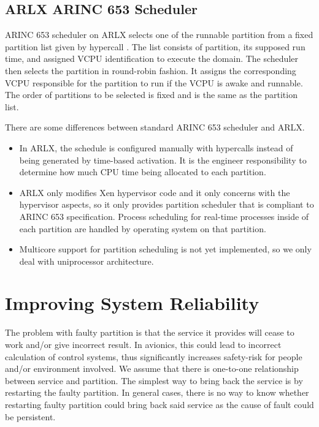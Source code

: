 \documentclass[conference]{IEEEtran}
\begin{document}
\subsection{ARLX ARINC 653 Scheduler}
ARINC 653 scheduler on ARLX selects one of the runnable partition from a fixed partition list
given by hypercall \cite{VanderLeest2010}. The list consists of partition, its supposed run
time, and assigned VCPU identification to execute the domain. The scheduler then selects the
partition in round-robin fashion. It assigns the corresponding VCPU responsible for the
partition to run if the VCPU is awake and runnable. The order of partitions to be selected is
fixed and is the same as the partition list.

There are some differences between standard ARINC 653 scheduler and ARLX.

\begin{itemize}
	\item In ARLX, the schedule is configured manually with hypercalls instead of
		being generated by time-based activation. It is the engineer responsibility to
		determine how much CPU time being allocated to each partition.

	\item ARLX only modifies Xen hypervisor code and it only concerns with the hypervisor
		aspects, so it only provides partition scheduler that is compliant to ARINC 653
		specification. Process scheduling for real-time processes inside of each
		partition are handled by operating system on that partition.

	\item Multicore support for partition scheduling is not yet implemented, so we only deal
		with uniprocessor architecture.
\end{itemize}

\section{Improving System Reliability}

The problem with faulty partition is that the service it provides will cease to work and/or give
incorrect result. In avionics, this could lead to incorrect calculation of control systems, thus
significantly increases safety-risk for people and/or environment involved. We assume that there
is one-to-one relationship between service and partition. The simplest way to bring back the
service is by restarting the faulty partition. In general cases, there is no way to know whether
restarting faulty partition could bring back said service as the cause of fault could be
persistent.
\end{document}

